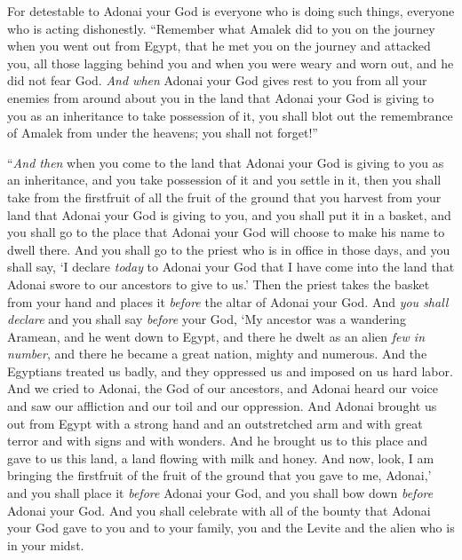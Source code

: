\begin{biblechapter}
\verse For detestable to Adonai your God is everyone who is doing such things, everyone who is acting dishonestly.
\verse “Remember what Amalek did to you on the journey when you went out from Egypt,
\verse that he met you on the journey and attacked you, all those lagging behind you and when you were weary and worn out, and he did not fear God.
\verse \textit{And when} Adonai your God gives rest to you from all your enemies from around about you in the land that Adonai your God is giving to you as an inheritance to take possession of it, you shall blot out the remembrance of Amalek from under the heavens; you shall not forget!”
\end{biblechapter}

\begin{biblechapter} %
\verse “\textit{And then} when you come to the land that Adonai your God is giving to you as an inheritance, and you take possession of it and you settle in it,
\verse then you shall take from the firstfruit of all the fruit of the ground that you harvest from your land that Adonai your God is giving to you, and you shall put it in a basket, and you shall go to the place that Adonai your God will choose to make his name to dwell there.
\verse And you shall go to the priest who is in office in those days, and you shall say, ‘I declare \textit{today} to Adonai your God that I have come into the land that Adonai swore to our ancestors to give to us.’
\verse Then the priest takes the basket from your hand and places it \textit{before} the altar of Adonai your God.
\verse And \textit{you shall declare} and you shall say \textit{before} your God, ‘My ancestor was a wandering Aramean, and he went down to Egypt, and there he dwelt as an alien \textit{few in number}, and there he became a great nation, mighty and numerous.
\verse And the Egyptians treated us badly, and they oppressed us and imposed on us hard labor.
\verse And we cried to Adonai, the God of our ancestors, and Adonai heard our voice and saw our affliction and our toil and our oppression.
\verse And Adonai brought us out from Egypt with a strong hand and an outstretched arm and with great terror and with signs and with wonders.
\verse And he brought us to this place and gave to us this land, a land flowing with milk and honey.
\verse And now, look, I am bringing the firstfruit of the fruit of the ground that you gave to me, Adonai,’ and you shall place it \textit{before} Adonai your God, and you shall bow down \textit{before} Adonai your God.
\verse And you shall celebrate with all of the bounty that Adonai your God gave to you and to your family, you and the Levite and the alien who is in your midst.

\end{biblechapter}
